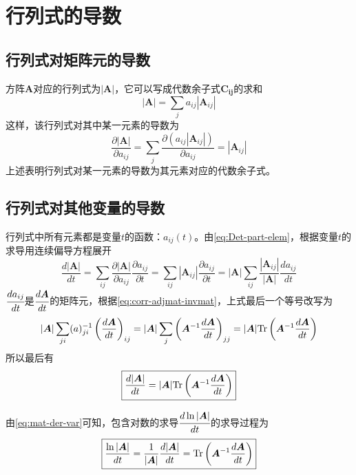 \section{行列式的导数}

\subsection{行列式对矩阵元的导数}
方阵$\bm{A}$对应的行列式为$|\bm{A}|$，它可以写成代数余子式$\bm{C_{ij}}$的求和
\begin{equation}
    |\bm{A}| = \sum_{j} a_{ij} |\bm{A}_{ij}|
    \label{eq:rep-cofactor}
\end{equation}
这样，该行列式对其中某一元素的导数为
\begin{equation}\boxed{
    \frac{\partial |\bm{A}|}{\partial a_{ij}} = \sum_{j} \frac{\partial \left(a_{ij} |\bm{A}_{ij}|\right)}{\partial a_{ij}} = |\bm{A}_{ij}|
    \label{eq:Det-part-elem}
}\end{equation}
上述表明行列式对某一元素的导数为其元素对应的代数余子式。

\subsection{行列式对其他变量的导数}
行列式中所有元素都是变量$t$的函数：$a_{ij}(t)$。由\cref{eq:Det-part-elem}，根据变量$t$的求导用连续偏导方程展开
\begin{equation*}
    \frac{d |\bm{A}|}{d t} = \sum_{ij} \frac{\partial |\bm{A}|}{\partial a_{ij}} \frac{\partial a_{ij}}{\partial t} = \sum_{ij} |\bm{A}_{ij}| \frac{\partial a_{ij}}{\partial t} = |\bm{A}| \sum_{ij} \frac{|\bm{A}_{ij}|}{|\bm{A}|} \frac{d a_{ij}}{d t}
\end{equation*}
$\cfrac{d a_{ij}}{d t}$是$\cfrac{d \bm{A}}{d t}$的矩阵元，根据\cref{eq:corr-adjmat-invmat}，上式最后一个等号改写为
\begin{equation*}
    |\bm{A}| \sum_{ji} (a)^{-1}_{ji} \left(\frac{d \bm{A}}{d t}\right)_{ij}
    =
    |\bm{A}| \sum_{j} \left( \bm{A}^{-1} \frac{d \bm{A}}{d t} \right)_{jj}
    = 
    |\bm{A}| {\rm Tr} \left( \bm{A}^{-1} \frac{d \bm{A}}{d t} \right)
\end{equation*}
所以最后有
\begin{equation}\boxed{
    \frac{d |\bm{A}|}{d t} = 
    |\bm{A}| {\rm Tr} \left( \bm{A}^{-1} \frac{d \bm{A}}{d t} \right)
    \label{eq:mat-der-var}
}\end{equation}

由\cref{eq:mat-der-var}可知，包含对数的求导$\cfrac{d \ln{|\bm{A}|}}{d t}$的求导过程为
\begin{equation}\boxed{
    \frac{\ln{|\bm{A}|}}{d t} = \frac{1}{|\bm{A}|} \frac{d |\bm{A}|}{d t} = {\rm Tr} \left( \bm{A}^{-1} \frac{d \bm{A}}{d t} \right)
    \label{eq:det-log-dev}
}\end{equation}
